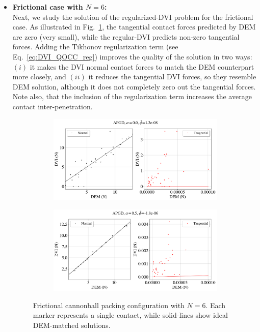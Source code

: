 \begin{itemize}
	
	\item 	\textbf{Frictional case with $N=6$:}\\
	Next, we study the solution of the regularized-DVI problem for the frictional case. 
	As illustrated in Fig.~\ref{fig:cbp_N=6}, the tangential contact forces predicted by DEM are zero (very small), while the regular-DVI predicts non-zero tangential forces. Adding the Tikhonov regularization term (see Eq.~\ref{eq:DVI_QOCC_reg}) improves the quality of the solution in two ways: $(i)$ it makes the DVI normal contact forces to match the DEM counterpart more closely, and $(ii)$ it reduces the tangential DVI forces, so they resemble DEM solution, although it does not completely zero out the tangential forces. Note also, that the inclusion of the regularization term increases the average contact inter-penetration. 
	
	\begin{figure}[H]
		\centering	
		\begin{subfigure}{0.9\columnwidth}	
			\centering
			\includegraphics[width=1.0\textwidth]{images/CD/Example7/11_DVI_APGD_al_0.png}
		\end{subfigure}
		
		\begin{subfigure}{0.9\columnwidth}	
			\centering
			\includegraphics[width=1.0\textwidth]{images/CD/Example7/13_DVI_APGD_al_05.png}
		\end{subfigure}
		\caption{Frictional cannonball packing configuration with $N=6$. Each marker represents a single contact, while solid-lines show ideal DEM-matched solutions.  }\label{fig:cbp_N=6}
	\end{figure}	
	

\end{itemize}
